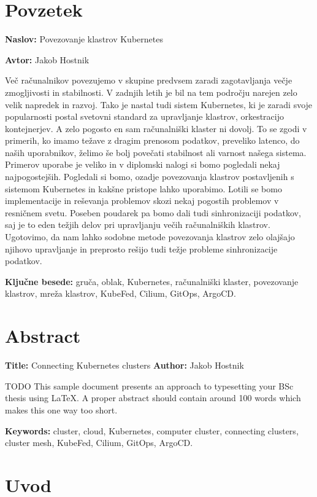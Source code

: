 \documentclass[a4paper, 12pt]{book}
\newcommand{\ttitle}{Povezovanje klastrov Kubernetes}
\newcommand{\ttitleEn}{Connecting Kubernetes clusters}
\newcommand{\tauthor}{Jakob Hostnik}
\newcommand{\tkeywords}{gruča, oblak, Kubernetes, računalniški klaster, povezovanje klastrov, mreža klastrov,  KubeFed, Cilium, GitOps, ArgoCD}
\newcommand{\tkeywordsEn}{cluster, cloud, Kubernetes, computer cluster, connecting clusters, cluster mesh,  KubeFed, Cilium, GitOps, ArgoCD}
\newcommand{\clearemptydoublepage}{\newpage{\pagestyle{empty}\cleardoublepage}}
\begin{document}
\chapter*{Povzetek}
\noindent\textbf{Naslov:} \ttitle
\bigskip

\noindent\textbf{Avtor:} \tauthor
\bigskip
\noindent 

Več računalnikov povezujemo v skupine predvsem zaradi zagotavljanja večje zmogljivosti in stabilnosti.
V zadnjih letih je bil na tem področju narejen zelo velik napredek in razvoj.
Tako je nastal tudi sistem Kubernetes, ki je zaradi svoje popularnosti postal svetovni standard za upravljanje klastrov, orkestracijo kontejnerjev.
A zelo pogosto en sam računalniški klaster ni dovolj.
To se zgodi v primerih, ko imamo težave z dragim prenosom podatkov, preveliko latenco, do naših uporabnikov,  želimo še bolj povečati stabilnost ali varnost našega sistema.
Primerov uporabe je veliko in v diplomski nalogi si bomo pogledali nekaj najpogostejših.
Pogledali si bomo, ozadje povezovanja klastrov postavljenih s sistemom Kubernetes in kakšne pristope lahko uporabimo.
Lotili se bomo implementacije in reševanja problemov skozi nekaj pogostih problemov v resničnem svetu.
Poseben poudarek pa bomo dali tudi sinhronizaciji podatkov, saj je to eden težjih delov pri upravljanju večih računalniških klastrov.
Ugotovimo, da nam lahko sodobne metode povezovanja klastrov zelo olajšajo njihovo upravljanje in preprosto rešijo tudi težje probleme sinhronizacije podatkov.

\bigskip
\noindent\textbf{Ključne besede:} \tkeywords.
\clearemptydoublepage
\chapter*{Abstract}
\noindent\textbf{Title:} \ttitleEn
\bigskip
\noindent\textbf{Author:} \tauthor
\bigskip
\noindent 

TODO
This sample document presents an approach to typesetting your BSc thesis using \LaTeX. 
A proper abstract should contain around 100 words which makes this one way too short.

\bigskip
\noindent\textbf{Keywords:} \tkeywordsEn.
\clearemptydoublepage
\mainmatter
\setcounter{page}{1}
\pagestyle{fancy}
\chapter{Uvod}
\label{uvod}
\end{document}
